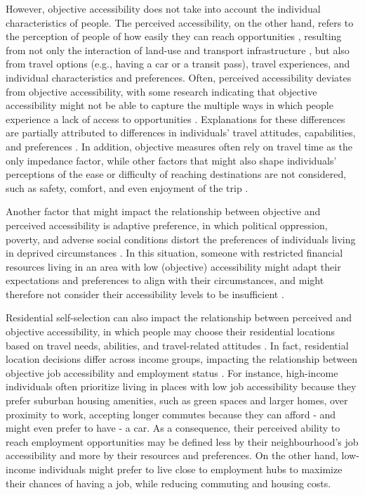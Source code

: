 \documentclass[preprint, 3p,
authoryear]{elsarticle} %
\begin{document}
However, objective accessibility does not take into account the
individual characteristics of people. The perceived accessibility, on
the other hand, refers to the perception of people of how easily they
can reach opportunities \citep{lättman2016, pot2025, mehdizadeh2025},
resulting from not only the interaction of land-use and transport
infrastructure \citep{geurs2004}, but also from travel options (e.g.,
having a car or a transit pass), travel experiences, and individual
characteristics and preferences. Often, perceived accessibility deviates
from objective accessibility, with some research indicating that
objective accessibility might not be able to capture the multiple ways
in which people experience a lack of access to opportunities
\citep{zhu2025}. Explanations for these differences are partially
attributed to differences in individuals' travel attitudes,
capabilities, and preferences \citep{devos2025, vandervlugt2022}. In
addition, objective measures often rely on travel time as the only
impedance factor, while other factors that might also shape individuals'
perceptions of the ease or difficulty of reaching destinations are not
considered, such as safety, comfort, and even enjoyment of the trip
\citep{handy2001evaluating, handy2020}.

Another factor that might impact the relationship between objective and
perceived accessibility is adaptive preference, in which political
oppression, poverty, and adverse social conditions distort the
preferences of individuals living in deprived circumstances
\citep{baber2007}. In this situation, someone with restricted financial
resources living in an area with low (objective) accessibility might
adapt their expectations and preferences to align with their
circumstances, and might therefore not consider their accessibility
levels to be insufficient \citep{negm2025}.

Residential self-selection can also impact the relationship between
perceived and objective accessibility, in which people may choose their
residential locations based on travel needs, abilities, and
travel-related attitudes \citep{cao2009}. In fact, residential location
decisions differ across income groups, impacting the relationship
between objective job accessibility and employment status
\citep{Hu2017}. For instance, high-income individuals often prioritize
living in places with low job accessibility because they prefer suburban
housing amenities, such as green spaces and larger homes, over proximity
to work, accepting longer commutes because they can afford - and might
even prefer to have - a car. As a consequence, their perceived ability
to reach employment opportunities may be defined less by their
neighbourhood's job accessibility and more by their resources and
preferences. On the other hand, low-income individuals might prefer to
live close to employment hubs to maximize their chances of having a job,
while reducing commuting and housing costs.
\end{document}
